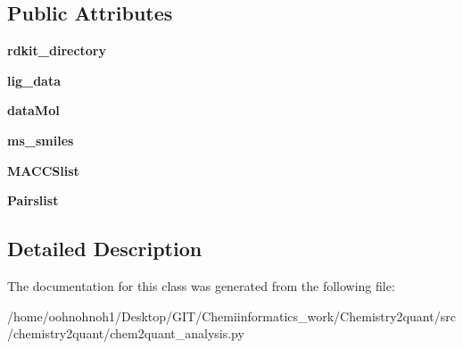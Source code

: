 \subsection*{Public Attributes}
\begin{DoxyCompactItemize}
\item
\mbox{\label{classchemistry2quant_1_1chem2quant__analysis_1_1rdkitProcessDf_a5f4a9d384d3faf2bac4bad875e82e77f}}
{\bfseries rdkit\+\_\+directory}
\item
\mbox{\label{classchemistry2quant_1_1chem2quant__analysis_1_1rdkitProcessDf_ac79af2ff958e5f99d853d17dd5b4ca09}}
{\bfseries lig\+\_\+data}
\item
\mbox{\label{classchemistry2quant_1_1chem2quant__analysis_1_1rdkitProcessDf_ab9e638e976cd3225c6dff6e0db4b0b06}}
{\bfseries data\+Mol}
\item
\mbox{\label{classchemistry2quant_1_1chem2quant__analysis_1_1rdkitProcessDf_a3c29d89aa2b61f7b79e87c9a0ef95114}}
{\bfseries ms\+\_\+smiles}
\item
\mbox{\label{classchemistry2quant_1_1chem2quant__analysis_1_1rdkitProcessDf_a837906c95ce51a9632de265d100b5aa6}}
{\bfseries M\+A\+C\+C\+Slist}
\item
\mbox{\label{classchemistry2quant_1_1chem2quant__analysis_1_1rdkitProcessDf_a57eaa83e147be2d2d59ca12095452935}}
{\bfseries Pairslist}
\end{DoxyCompactItemize}


\subsection{Detailed Description}
\begin{DoxyVerb}\end{DoxyVerb}


The documentation for this class was generated from the following file\+:\begin{DoxyCompactItemize}
\item
/home/oohnohnoh1/\+Desktop/\+G\+I\+T/\+Chemiinformatics\+\_\+work/\+Chemistry2quant/src/chemistry2quant/chem2quant\+\_\+analysis.\+py\end{DoxyCompactItemize}
